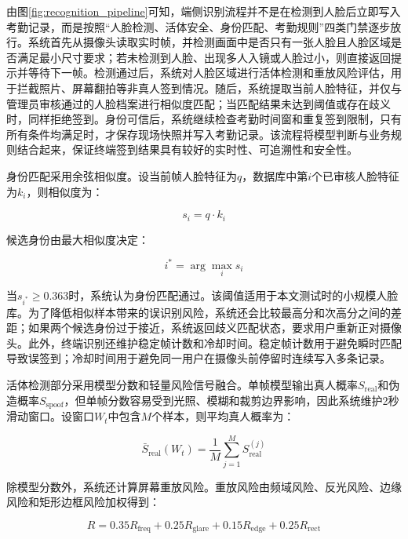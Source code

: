 由图\ref{fig:recognition_pipeline}可知，端侧识别流程并不是在检测到人脸后立即写入考勤记录，而是按照“人脸检测、活体安全、身份匹配、考勤规则”四类门禁逐步放行。系统首先从摄像头读取实时帧，并检测画面中是否只有一张人脸且人脸区域是否满足最小尺寸要求；若未检测到人脸、出现多人入镜或人脸过小，则直接返回提示并等待下一帧。检测通过后，系统对人脸区域进行活体检测和重放风险评估，用于拦截照片、屏幕翻拍等非真人签到情况。随后，系统提取当前人脸特征，并仅与管理员审核通过的人脸档案进行相似度匹配；当匹配结果未达到阈值或存在歧义时，同样拒绝签到。身份可信后，系统继续检查考勤时间窗和重复签到限制，只有所有条件均满足时，才保存现场快照并写入考勤记录。该流程将模型判断与业务规则结合起来，保证终端签到结果具有较好的实时性、可追溯性和安全性。

身份匹配采用余弦相似度。设当前帧人脸特征为$q$，数据库中第$i$个已审核人脸特征为$k_i$，则相似度为：

\begin{equation}
    s_i = q \cdot k_i
\end{equation}

候选身份由最大相似度决定：

\begin{equation}
    i^* = \arg\max_i s_i
\end{equation}

当$s_{i^*} \geq 0.363$时，系统认为身份匹配通过。该阈值适用于本文测试时的小规模人脸库。为了降低相似样本带来的误识别风险，系统还会比较最高分和次高分之间的差距；如果两个候选身份过于接近，系统返回歧义匹配状态，要求用户重新正对摄像头。此外，终端识别还维护稳定帧计数和冷却时间。稳定帧计数用于避免瞬时匹配导致误签到；冷却时间用于避免同一用户在摄像头前停留时连续写入多条记录。

活体检测部分采用模型分数和轻量风险信号融合。单帧模型输出真人概率$S_{\text{real}}$和伪造概率$S_{\text{spoof}}$，但单帧分数容易受到光照、模糊和裁剪边界影响，因此系统维护2秒滑动窗口。设窗口$W_t$中包含$M$个样本，则平均真人概率为：

\begin{equation}
    \bar{S}_{\text{real}}(W_t)=\frac{1}{M}\sum_{j=1}^{M}S_{\text{real}}^{(j)}
\end{equation}

除模型分数外，系统还计算屏幕重放风险。重放风险由频域风险、反光风险、边缘风险和矩形边框风险加权得到：

\begin{equation}
    R = 0.35R_{\text{freq}} + 0.25R_{\text{glare}} + 0.15R_{\text{edge}} + 0.25R_{\text{rect}}
\end{equation}

